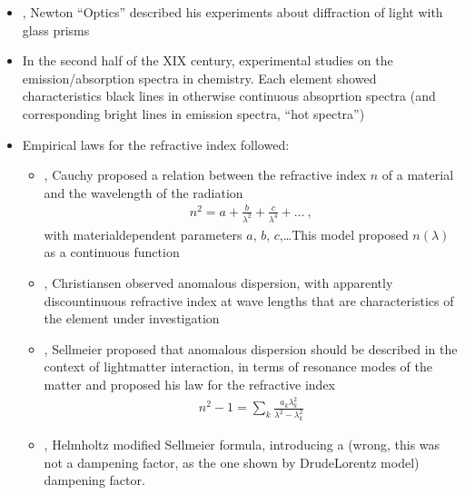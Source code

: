 \documentclass[letterpaper,10pt,english]{jupyterBook}
\begin{document}
\sphinxAtStartPar
{}
\begin{itemize}
\item {} 
, Newton “Optics” described his experiments about diffraction of light with glass prisms

\item {} 
\sphinxAtStartPar
In the second half of the XIX century, experimental studies on the emission/absorption spectra in chemistry. Each element showed characteristics black lines in otherwise continuous absoprtion spectra (and corresponding bright lines in emission spectra, “hot spectra”)

\item {} 
\sphinxAtStartPar
Empirical laws for the refractive index followed:
\begin{itemize}
\item {} 
, Cauchy proposed a relation between the refractive index \(n\) of a material and the wave\sphinxhyphen{}length of the radiation
\begin{equation*}
\begin{split}n^2 = a + \frac{b}{\lambda^2} + \frac{c}{\lambda^4} + \dots \ ,\end{split}
\end{equation*}
\sphinxAtStartPar
with material\sphinxhyphen{}dependent parameters \(a\), \(b\), \(c\),…This model proposed \(n(\lambda)\) as a continuous function

\item {} 
, Christiansen observed anomalous dispersion, with apparently discountinuous refractive index at wave lengths that are characteristics of the element under investigation

\item {} 
, Sellmeier proposed that anomalous dispersion should be described in the context of light\sphinxhyphen{}matter interaction, in terms of resonance modes of the matter and proposed his law for the refractive index
\begin{equation*}
\begin{split}n^2 - 1 = \sum_{k} \frac{a_k \lambda_k^2}{\lambda^2 - \lambda^2_k}\end{split}
\end{equation*}
\item {} 
, Helmholtz modified Sellmeier formula, introducing a (wrong, this was not a dampening factor, as the one shown by Drude\sphinxhyphen{}Lorentz model) dampening factor.


\end{itemize}
\end{itemize}
\end{document}
